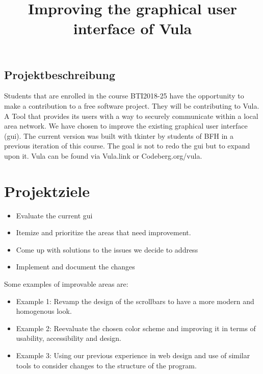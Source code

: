 \documentclass[
	trilingual,
	type=projectproposal,
	twocolumn
]{bfhpub}
\begin{document}
 
\title{Improving the graphical user interface of Vula}
\subject{Das ist ein Teaser auf dem Titelblatt. Making secure communication more accessible by improving the user experience.}
 
 
 
%
 
 
\begin{ProjectDescription}
  \section{Projektbeschreibung}
  Students that are enrolled in the course BTI2018-25 have the opportunity to make a contribution to a free software project. They will be contributing to Vula. A Tool that provides its users with a way to securely communicate within a local area network. We have chosen to improve the existing graphical user interface (gui). The current version was built with tkinter by students of BFH in a previous iteration of this course. The goal is not to redo the gui but to expand upon it. Vula can be found via Vula.link or Codeberg.org/vula.
\end{ProjectDescription}
 
\maketitle
 
\section{Projektziele}
\begin{itemize}
  \item Evaluate the current gui
  \item Itemize and prioritize the areas that need improvement.
  \item Come up with solutions to the issues we decide to address
  \item Implement and document the changes
\end{itemize}
Some examples of improvable areas are:
\begin{itemize}
  \item Example 1: Revamp the design of the scrollbars to have a more modern and homogenous look.
  \item Example 2: Reevaluate the chosen color scheme and improving it in terms of usability, accessibility and design.
  \item Example 3: Using our previous experience in web design and use of similar tools to consider changes to the structure of the program.
\end{itemize}
\vfill
\end{document}
